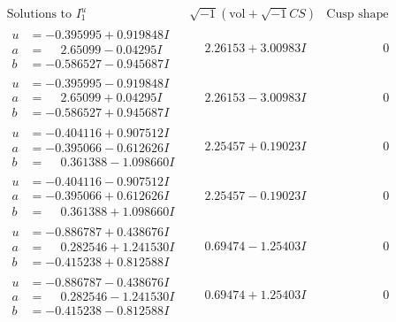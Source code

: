\documentclass[1p]{elsarticle_modified}
\theoremstyle{definition}
\newcommand{\I}{\sqrt{-1}}
\begin{document}
$$\begin{array}{c|c|c}  
\text{Solutions to }I^u_{1}& \I (\text{vol} + \sqrt{-1}CS) & \text{Cusp shape}\\
 \hline 
\begin{aligned}
u &= -0.395995 + 0.919848 I \\
a &= \phantom{-}2.65099 - 0.04295 I \\
b &= -0.586527 - 0.945687 I\end{aligned}
 & \phantom{-}2.26153 + 3.00983 I & \phantom{-0.000000 } 0 \\ \hline\begin{aligned}
u &= -0.395995 - 0.919848 I \\
a &= \phantom{-}2.65099 + 0.04295 I \\
b &= -0.586527 + 0.945687 I\end{aligned}
 & \phantom{-}2.26153 - 3.00983 I & \phantom{-0.000000 } 0 \\ \hline\begin{aligned}
u &= -0.404116 + 0.907512 I \\
a &= -0.395066 - 0.612626 I \\
b &= \phantom{-}0.361388 - 1.098660 I\end{aligned}
 & \phantom{-}2.25457 + 0.19023 I & \phantom{-0.000000 } 0 \\ \hline\begin{aligned}
u &= -0.404116 - 0.907512 I \\
a &= -0.395066 + 0.612626 I \\
b &= \phantom{-}0.361388 + 1.098660 I\end{aligned}
 & \phantom{-}2.25457 - 0.19023 I & \phantom{-0.000000 } 0 \\ \hline\begin{aligned}
u &= -0.886787 + 0.438676 I \\
a &= \phantom{-}0.282546 + 1.241530 I \\
b &= -0.415238 + 0.812588 I\end{aligned}
 & \phantom{-}0.69474 - 1.25403 I & \phantom{-0.000000 } 0 \\ \hline\begin{aligned}
u &= -0.886787 - 0.438676 I \\
a &= \phantom{-}0.282546 - 1.241530 I \\
b &= -0.415238 - 0.812588 I\end{aligned}
 & \phantom{-}0.69474 + 1.25403 I & \phantom{-0.000000 } 0 \\ \hline\begin{aligned}

\end{aligned}
\end{array}$$
\end{document}
